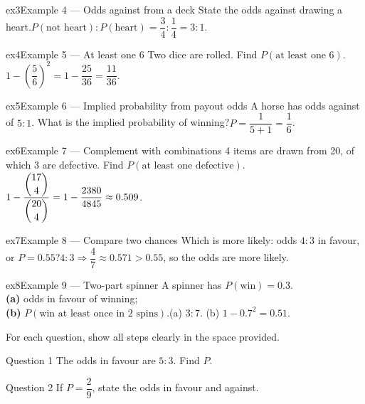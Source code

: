 \documentclass[11pt]{article}
\begin{document}
\begin{example}{ex3}{Example 4 --- Odds against from a deck}
State the odds against drawing a heart.\soln $P(\text{not heart}):P(\text{heart})=\dfrac34:\dfrac14=3:1$.
\end{example}

\begin{example}{ex4}{Example 5 --- At least one 6}
Two dice are rolled. Find $P(\text{at least one 6})$.\soln $1-\left(\dfrac56\right)^2=1-\dfrac{25}{36}=\dfrac{11}{36}$.
\end{example}

\begin{example}{ex5}{Example 6 --- Implied probability from payout odds}
A horse has odds against of $5:1$. What is the implied probability of winning?\soln $P=\dfrac{1}{5+1}=\dfrac16$.
\end{example}

\begin{example}{ex6}{Example 7 --- Complement with combinations}
4 items are drawn from 20, of which 3 are defective. Find $P(\text{at least one defective})$.\soln $1-\dfrac{\dbinom{17}{4}}{\dbinom{20}{4}}=1-\dfrac{2380}{4845}\approx0.509$.
\end{example}

\begin{example}{ex7}{Example 8 --- Compare two chances}
Which is more likely: odds $4:3$ in favour, or $P=0.55$?\soln $4:3\Rightarrow\dfrac47\approx0.571>0.55$, so the odds are more likely.
\end{example}

\begin{example}{ex8}{Example 9 --- Two-part spinner}
A spinner has $P(\text{win})=0.3$. \\ \textbf{(a)} odds in favour of winning; \\ \textbf{(b)} $P(\text{win at least once in 2 spins})$.\soln (a) $3:7$. (b) $1-0.7^2=0.51$.
\end{example}

\clearpage
{}
For each question, show all steps clearly in the space provided.

\begin{qbox}{Question 1}
The odds in favour are $5:3$. Find $P$.\workspace{2.4cm}
\end{qbox}

\begin{qbox}{Question 2}
If $P=\dfrac29$, state the odds in favour and against.\workspace{2.4cm}
\end{qbox}
\end{document}
